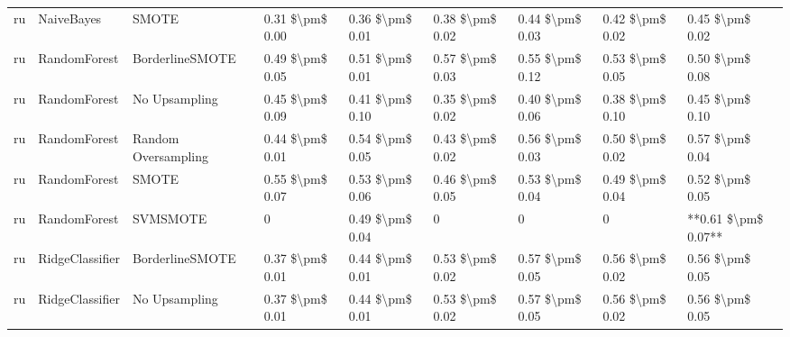 \begin{tabular}{lllllllll}
      ru &                      NaiveBayes &                         SMOTE & 0.31 \$\textbackslash pm\$ 0.00 &           0.36 \$\textbackslash pm\$ 0.01 &       0.38 \$\textbackslash pm\$ 0.02 &        0.44 \$\textbackslash pm\$ 0.03 &                         0.42 \$\textbackslash pm\$ 0.02 &     0.45 \$\textbackslash pm\$ 0.02 \\
      ru &                    RandomForest &               BorderlineSMOTE & 0.49 \$\textbackslash pm\$ 0.05 &           0.51 \$\textbackslash pm\$ 0.01 &       0.57 \$\textbackslash pm\$ 0.03 &        0.55 \$\textbackslash pm\$ 0.12 &                         0.53 \$\textbackslash pm\$ 0.05 &     0.50 \$\textbackslash pm\$ 0.08 \\
      ru &                    RandomForest &                 No Upsampling & 0.45 \$\textbackslash pm\$ 0.09 &           0.41 \$\textbackslash pm\$ 0.10 &       0.35 \$\textbackslash pm\$ 0.02 &        0.40 \$\textbackslash pm\$ 0.06 &                         0.38 \$\textbackslash pm\$ 0.10 &     0.45 \$\textbackslash pm\$ 0.10 \\
      ru &                    RandomForest &           Random Oversampling & 0.44 \$\textbackslash pm\$ 0.01 &           0.54 \$\textbackslash pm\$ 0.05 &       0.43 \$\textbackslash pm\$ 0.02 &        0.56 \$\textbackslash pm\$ 0.03 &                         0.50 \$\textbackslash pm\$ 0.02 &     0.57 \$\textbackslash pm\$ 0.04 \\
      ru &                    RandomForest &                         SMOTE & 0.55 \$\textbackslash pm\$ 0.07 &           0.53 \$\textbackslash pm\$ 0.06 &       0.46 \$\textbackslash pm\$ 0.05 &        0.53 \$\textbackslash pm\$ 0.04 &                         0.49 \$\textbackslash pm\$ 0.04 &     0.52 \$\textbackslash pm\$ 0.05 \\
      ru &                    RandomForest &                      SVMSMOTE &               0 &           0.49 \$\textbackslash pm\$ 0.04 &                     0 &                      0 &                                       0 & **0.61 \$\textbackslash pm\$ 0.07** \\
      ru &                 RidgeClassifier &               BorderlineSMOTE & 0.37 \$\textbackslash pm\$ 0.01 &           0.44 \$\textbackslash pm\$ 0.01 &       0.53 \$\textbackslash pm\$ 0.02 &        0.57 \$\textbackslash pm\$ 0.05 &                         0.56 \$\textbackslash pm\$ 0.02 &     0.56 \$\textbackslash pm\$ 0.05 \\
      ru &                 RidgeClassifier &                 No Upsampling & 0.37 \$\textbackslash pm\$ 0.01 &           0.44 \$\textbackslash pm\$ 0.01 &       0.53 \$\textbackslash pm\$ 0.02 &        0.57 \$\textbackslash pm\$ 0.05 &                         0.56 \$\textbackslash pm\$ 0.02 &     0.56 \$\textbackslash pm\$ 0.05 \\

\end{tabular}

